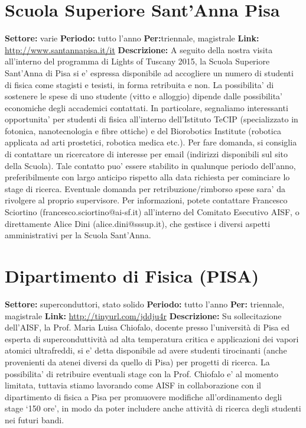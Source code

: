 \documentclass[a4paper,10pt]{article}
\begin{document}
\section{Scuola Superiore Sant'Anna Pisa}
\textbf{Settore:} varie\newline
\textbf{Periodo:} tutto l'anno\newline
\textbf{Per:}triennale, magistrale\newline
\textbf{Link:} \url{http://www.santannapisa.it/it} \newline
\textbf{Descrizione:}   A seguito della nostra 
visita all'interno del programma di Lights of Tuscany 2015, la Scuola Superiore Sant'Anna di Pisa si e' espressa disponibile ad accogliere un numero di studenti di fisica come stagisti e tesisti, in 
 forma retribuita e non. La possibilita' di sostenere le spese di uno studente (vitto e alloggio) dipende dalle possibilita' economiche degli accademici contattati. In particolare, segnaliamo 
 interessanti opportunita' per studenti di fisica all'interno dell'Istituto TeCIP (specializzato in fotonica, nanotecnologia e fibre ottiche) e del Biorobotics Institute (robotica applicata ad arti 
 prostetici, robotica medica etc.). Per fare domanda, si consiglia di contattare un ricercatore di interesse per email (indirizzi disponibili sul sito della Scuola). Tale contatto puo' essere stabilito 
 in qualunque periodo dell'anno, preferibilmente con largo anticipo rispetto alla data richiesta per cominciare lo stage di ricerca. Eventuale domanda per retribuzione/rimborso spese sara' da rivolgere 
 al proprio supervisore. Per informazioni, potete contattare Francesco Sciortino (francesco.sciortino@ai-sf.it) all'interno del Comitato Esecutivo AISF, o direttamente Alice Dini (alice.dini@sssup.it), 
 che gestisce i diversi aspetti amministrativi per la Scuola Sant'Anna.  

 \section{Dipartimento di Fisica (PISA)}
 \textbf{Settore:} superconduttori, stato solido\newline
\textbf{Periodo:} tutto l'anno\newline
\textbf{Per:} triennale, magistrale\newline
\textbf{Link:} \url{http://tinyurl.com/jddju4r} \newline
\textbf{Descrizione:}  Su sollecitazione dell'AISF, la Prof. Maria Luisa Chiofalo, docente presso l’università di Pisa ed esperta di superconduttività ad alta temperatura critica 
 e applicazioni dei vapori atomici ultrafreddi, si e’ detta disponibile ad avere studenti tirocinanti (anche provenienti da atenei diversi da quello di Pisa) per progetti di ricerca. La possibilita’ di 
 retribuire eventuali stage con la Prof. Chiofalo e’ al momento limitata, tuttavia stiamo lavorando come AISF in collaborazione con il dipartimento di fisica a Pisa per promuovere modifiche 
 all’ordinamento degli stage ‘150 ore’, in modo da poter includere anche attività di ricerca degli studenti nei futuri bandi.  
\end{document}
